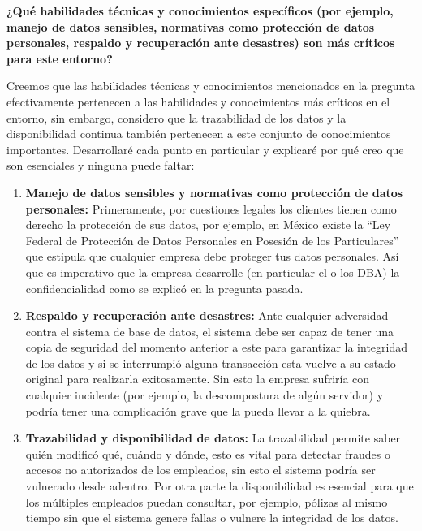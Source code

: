 \textbf{¿Qué habilidades técnicas y conocimientos específicos (por ejemplo, manejo de datos sensibles, normativas como protección de datos personales, respaldo y recuperación ante desastres) son más críticos para este entorno?}

Creemos que las habilidades técnicas y conocimientos mencionados en la pregunta efectivamente pertenecen a las habilidades y conocimientos más críticos en el entorno, sin embargo, considero que la trazabilidad de los datos y la disponibilidad continua también pertenecen a este conjunto de conocimientos importantes. Desarrollaré cada punto en particular y explicaré por qué creo que son esenciales y ninguna puede faltar:

\begin{enumerate}
    \item \textbf{Manejo de datos sensibles y normativas como protección de datos personales:} Primeramente, por cuestiones legales los clientes tienen como derecho la protección de sus datos, por ejemplo, en México existe la ``Ley Federal de Protección de Datos Personales en Posesión de los Particulares'' que estipula que cualquier empresa debe proteger tus datos personales. Así que es imperativo que la empresa desarrolle (en particular el o los DBA) la confidencialidad como se explicó en la pregunta pasada.
    
    \item \textbf{Respaldo y recuperación ante desastres:} Ante cualquier adversidad contra el sistema de base de datos, el sistema debe ser capaz de tener una copia de seguridad del momento anterior a este para garantizar la integridad de los datos y si se interrumpió alguna transacción esta vuelve a su estado original para realizarla exitosamente. Sin esto la empresa sufriría con cualquier incidente (por ejemplo, la descompostura de algún servidor) y podría tener una complicación grave que la pueda llevar a la quiebra.
    
    \item \textbf{Trazabilidad y disponibilidad de datos:} La trazabilidad permite saber quién modificó qué, cuándo y dónde, esto es vital para detectar fraudes o accesos no autorizados de los empleados, sin esto el sistema podría ser vulnerado desde adentro. Por otra parte la disponibilidad es esencial para que los múltiples empleados puedan consultar, por ejemplo, pólizas al mismo tiempo sin que el sistema genere fallas o vulnere la integridad de los datos.
\end{enumerate}

